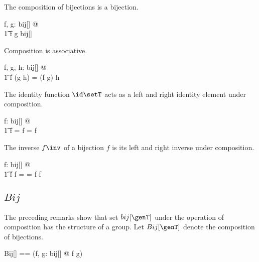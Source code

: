 \documentclass{amsart}
\begin{document}
\begin{remark}
The composition of bijections is a bijection.

\begin{zed}
	\forall f, g: bij[\setT] @ \\
	\t1	f \circ g \in bij[\setT]
\end{zed}

\end{remark}

\begin{remark}
Composition is associative.

\begin{zed}
	\forall f, g, h: bij[\setT] @ \\
	\t1	f \circ (g \circ h) = (f \circ g) \circ h
\end{zed}

\end{remark}

\begin{remark}
The identity function $\id \setT$ acts as a left and right identity element under composition.

\begin{zed}
	\forall f: bij[\setT] @ \\
	\t1	 \id \setT \circ f = f = f \circ \id \setT
\end{zed}

\end{remark}

\begin{remark}
The inverse $f \inv$ of a bijection $f$ is its left and right inverse under composition.

\begin{zed}
	\forall f: bij[\setT] @ \\
	\t1	f \circ f \inv = \id \setT = f \inv \circ f
\end{zed}

\end{remark}

\subsection{$Bij$}

The preceding remarks show that set $bij[\genT]$ under the operation of composition has the structure of a group.
Let $Bij[\genT]$ denote the composition of bijections.

\begin{zed}
	Bij[\genT] == (\lambda f, g: bij[\genT] @ f \circ g)
\end{zed}
\end{document}
